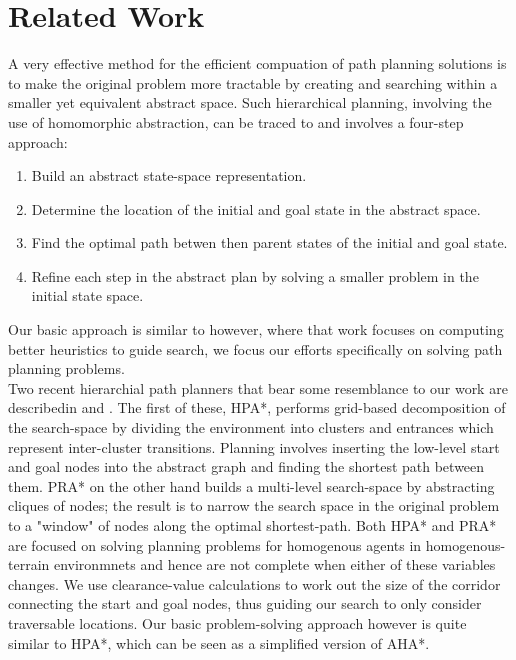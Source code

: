 \section{Related Work}
A very effective method for the efficient compuation of path planning solutions is to make the original problem more tractable by creating and searching within a smaller yet equivalent abstract space. Such hierarchical planning, involving the use of homomorphic abstraction, can be traced to \cite{holte96} and involves a four-step approach:
\begin{enumerate}
\item{Build an abstract state-space representation.}
\item{Determine the location of the initial and goal state in the abstract space.}
\item{Find the optimal path betwen then parent states of the initial and goal state. }
\item{Refine each step in the abstract plan by solving a smaller problem in the initial state space.}
\end{enumerate}
Our basic approach is similar to \cite{holte96} however, where that work focuses on computing better heuristics to guide search, we focus our efforts specifically on solving path planning problems. \\ \newline 
Two recent hierarchial path planners that bear some resemblance to our work are describedin \cite{botea04} and \cite{sturtevant05}. The first of these, HPA*, performs grid-based decomposition of the search-space by dividing the environment into clusters and entrances which represent inter-cluster transitions. Planning involves inserting the low-level start and goal nodes into the abstract graph and finding the shortest path between them. 
PRA* on the other hand builds a multi-level search-space by abstracting cliques of nodes; the result is to narrow the search space in the original problem to a "window" of nodes along the optimal shortest-path.\newline
Both HPA* and PRA* are focused on solving planning problems for homogenous agents in homogenous-terrain environmnets and hence are not complete when either of these variables changes. We use clearance-value calculations to work out the size of the corridor connecting the start and goal nodes, thus guiding our search to only consider traversable locations. Our basic problem-solving approach however is quite similar to HPA*, which can be seen as a simplified version of AHA*. \\ \newline
